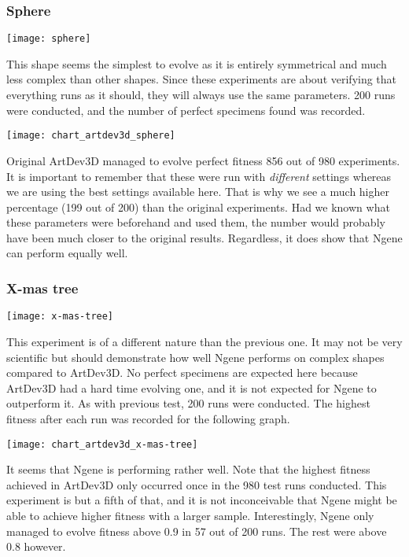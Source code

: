 \subsubsection{Sphere}
\begin{center}\texttt{[image: sphere]}\end{center}
This shape seems the simplest to evolve as it is entirely symmetrical and much less complex than other shapes. Since these experiments are about verifying that everything runs as it should, they will always use the same parameters. 200 runs were conducted, and the number of perfect specimens found was recorded.

\begin{center}\texttt{[image: chart\_artdev3d\_sphere]}\end{center}

Original ArtDev3D managed to evolve perfect fitness 856 out of 980 experiments. It is important to remember that these were run with \emph{different} settings whereas we are using the best settings available here. That is why we see a much higher percentage (199 out of 200) than the original experiments. Had we known what these parameters were beforehand and used them, the number would probably have been much closer to the original results. Regardless, it does show that Ngene can perform equally well.

\subsubsection{X-mas tree}
\begin{center}\texttt{[image: x-mas-tree]}\end{center}
This experiment is of a different nature than the previous one. It may not be very scientific but should demonstrate how well Ngene performs on complex shapes compared to ArtDev3D. No perfect specimens are expected here because ArtDev3D had a hard time evolving one, and it is not expected for Ngene to outperform it. As with previous test, 200 runs were conducted. The highest fitness after each run was recorded for the following graph.

\begin{center}\texttt{[image: chart\_artdev3d\_x-mas-tree]}\end{center}

It seems that Ngene is performing rather well. Note that the highest fitness achieved in ArtDev3D only occurred once in the 980 test runs conducted. This experiment is but a fifth of that, and it is not inconceivable that Ngene might be able to achieve higher fitness with a larger sample. Interestingly, Ngene only managed to evolve fitness above 0.9 in 57 out of 200 runs. The rest were above 0.8 however.

